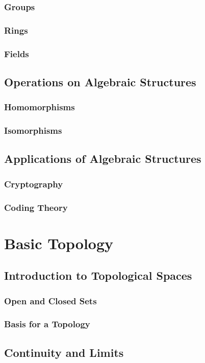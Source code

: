 \subsubsection{Groups}
\subsubsection{Rings}
\subsubsection{Fields}
\subsection{Operations on Algebraic Structures}
\subsubsection{Homomorphisms}
\subsubsection{Isomorphisms}
\subsection{Applications of Algebraic Structures}
\subsubsection{Cryptography}
\subsubsection{Coding Theory}

\section{Basic Topology}
\lipsum
\subsection{Introduction to Topological Spaces}
\subsubsection{Open and Closed Sets}
\subsubsection{Basis for a Topology}
\subsection{Continuity and Limits}
